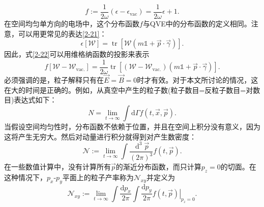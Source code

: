 \begin{equation}\label{2-22}
f:=\frac1{2\omega}\left(\epsilon-\epsilon_{\mathrm{vac}}\right)=\frac1{2\omega}\epsilon+1.
\end{equation}
在空间均匀单方向的电场中，这个分布函数$f$与QVE中的分布函数的定义相同。注意，可以用更常见的表达\ref{2-21}：
\begin{equation}
\epsilon[\mathcal{W}]=\operatorname{tr}[\mathcal{W}(m\mathbb{1}+\vec{p}\cdot\vec{\gamma})].
\end{equation}
因此，式\ref{2-22}可以用维格纳函数的投影来表示
\begin{equation}
f[\mathcal{W}-\mathcal{W}_{\mathrm{vac.}}]=\frac1{2\omega}\operatorname{tr}\left[\left(\mathcal{W}-\mathcal{W}_{\mathrm{vac.}}\right)(m\mathbb{1}+\vec{p}\cdot\vec{\gamma})\right].
\end{equation}
必须强调的是，粒子解释只有在$\vec{E}=\vec{B}=0$时才有效。对于本文所讨论的情况，这在大的时间是正确的。例如，从真空中产生的粒子数(粒子数目=反粒子数目=对数目)表达式如下：
\begin{equation}
N=\lim_{t\to\infty}\int\mathrm{d}\Gamma f(t,\vec{x},\vec{p}).
\end{equation}
当假设空间均匀性时，分布函数不依赖于位置，并且在空间上积分没有意义，因为这将产生无穷大。然后对动量进行积分就得到对产生数密度：
\begin{equation}
\mathcal{N}:=\lim_{t\to\infty}\int\frac{\operatorname{d}^3\vec{p}}{\left(2\pi\right)^3}f(t,\vec{p}).
\end{equation}
在一些数值计算中，没有计算所有$\vec{p}$的渐近分布函数，而只计算$p_z=0$的切面。在这种情况下，$p_x$-$p_y$平面上的粒子产率称为$\mathcal{N}_{xy}$并定义为
\begin{equation}
\mathcal{N}_{xy}:=\lim_{t\to\infty}\int\frac{\mathrm{d}p_x}{2\pi}\int\frac{\mathrm{d}p_y}{2\pi}\left.f(t,\vec{p})\right|_{p_z=0}.
\end{equation}
